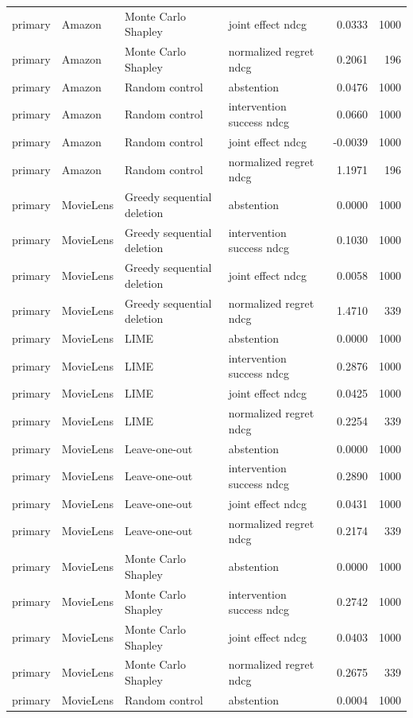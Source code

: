 \begin{longtable}{@{}p{.16\linewidth}p{.11\linewidth}p{.15\linewidth}p{.22\linewidth}rr@{}}
primary & Amazon & Monte Carlo Shapley & joint effect ndcg & 0.0333 & 1000 \\
primary & Amazon & Monte Carlo Shapley & normalized regret ndcg & 0.2061 & 196 \\
primary & Amazon & Random control & abstention & 0.0476 & 1000 \\
primary & Amazon & Random control & intervention success ndcg & 0.0660 & 1000 \\
primary & Amazon & Random control & joint effect ndcg & -0.0039 & 1000 \\
primary & Amazon & Random control & normalized regret ndcg & 1.1971 & 196 \\
primary & MovieLens & Greedy sequential deletion & abstention & 0.0000 & 1000 \\
primary & MovieLens & Greedy sequential deletion & intervention success ndcg & 0.1030 & 1000 \\
primary & MovieLens & Greedy sequential deletion & joint effect ndcg & 0.0058 & 1000 \\
primary & MovieLens & Greedy sequential deletion & normalized regret ndcg & 1.4710 & 339 \\
primary & MovieLens & LIME & abstention & 0.0000 & 1000 \\
primary & MovieLens & LIME & intervention success ndcg & 0.2876 & 1000 \\
primary & MovieLens & LIME & joint effect ndcg & 0.0425 & 1000 \\
primary & MovieLens & LIME & normalized regret ndcg & 0.2254 & 339 \\
primary & MovieLens & Leave-one-out & abstention & 0.0000 & 1000 \\
primary & MovieLens & Leave-one-out & intervention success ndcg & 0.2890 & 1000 \\
primary & MovieLens & Leave-one-out & joint effect ndcg & 0.0431 & 1000 \\
primary & MovieLens & Leave-one-out & normalized regret ndcg & 0.2174 & 339 \\
primary & MovieLens & Monte Carlo Shapley & abstention & 0.0000 & 1000 \\
primary & MovieLens & Monte Carlo Shapley & intervention success ndcg & 0.2742 & 1000 \\
primary & MovieLens & Monte Carlo Shapley & joint effect ndcg & 0.0403 & 1000 \\
primary & MovieLens & Monte Carlo Shapley & normalized regret ndcg & 0.2675 & 339 \\
primary & MovieLens & Random control & abstention & 0.0004 & 1000 \\

\end{longtable}
